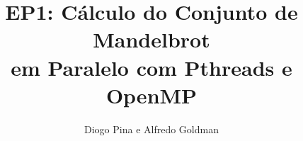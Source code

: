 \documentclass[final,12pt,a4paper]{elsarticle}
\begin{document}
\begin{frontmatter}


\title{EP1: Cálculo do Conjunto de Mandelbrot \\ em Paralelo com Pthreads e OpenMP}




\author{Diogo Pina e Alfredo Goldman}

\address{MAC0219/5742 - Programação Concorrente e Paralela}




\end{frontmatter}
\end{document}
